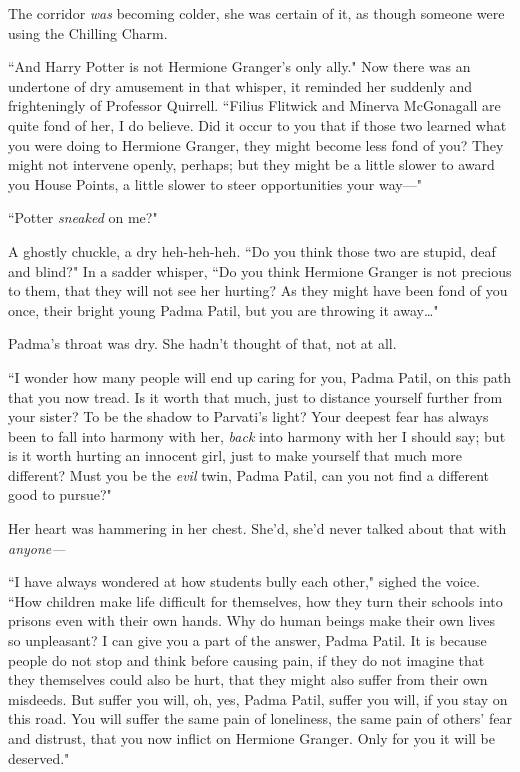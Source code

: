 The corridor \emph{was} becoming colder, she was certain of it, as though someone were using the Chilling Charm.

``And Harry Potter is not Hermione Granger's only ally." Now there was an undertone of dry amusement in that whisper, it reminded her suddenly and frighteningly of Professor Quirrell. ``Filius Flitwick and Minerva McGonagall are quite fond of her, I do believe. Did it occur to you that if those two learned what you were doing to Hermione Granger, they might become less fond of you? They might not intervene openly, perhaps; but they might be a little slower to award you House Points, a little slower to steer opportunities your way—"

``Potter \emph{sneaked} on me?"

A ghostly chuckle, a dry heh-heh-heh. ``Do you think those two are stupid, deaf and blind?" In a sadder whisper, ``Do you think Hermione Granger is not precious to them, that they will not see her hurting? As they might have been fond of you once, their bright young Padma Patil, but you are throwing it away{\ldots}"

Padma's throat was dry. She hadn't thought of that, not at all.

``I wonder how many people will end up caring for you, Padma Patil, on this path that you now tread. Is it worth that much, just to distance yourself further from your sister? To be the shadow to Parvati's light? Your deepest fear has always been to fall into harmony with her, \emph{back} into harmony with her I should say; but is it worth hurting an innocent girl, just to make yourself that much more different? Must you be the \emph{evil} twin, Padma Patil, can you not find a different good to pursue?"

Her heart was hammering in her chest. She'd, she'd never talked about that with \emph{anyone—}

``I have always wondered at how students bully each other," sighed the voice. ``How children make life difficult for themselves, how they turn their schools into prisons even with their own hands. Why do human beings make their own lives so unpleasant? I can give you a part of the answer, Padma Patil. It is because people do not stop and think before causing pain, if they do not imagine that they themselves could also be hurt, that they might also suffer from their own misdeeds. But suffer you will, oh, yes, Padma Patil, suffer you will, if you stay on this road. You will suffer the same pain of loneliness, the same pain of others' fear and distrust, that you now inflict on Hermione Granger. Only for you it will be deserved."

